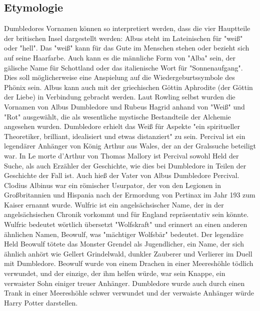 \documentclass[a4paper, 10pt]{article}
\begin{document}
\subsection*{\Large Etymologie}
Dumbledores Vornamen können so interpretiert werden, dass die vier Hauptteile der britischen Insel dargestellt werden:
\vspace{10pt}
\newline
Albus steht im Lateinischen für "weiß" oder "hell". Das "weiß" kann für das Gute im Menschen stehen oder bezieht sich auf seine Haarfarbe. Auch kann es die männliche Form von "Alba" sein, der gälische Name für Schottland oder das italienische Wort für "Sonnenaufgang". Dies soll möglicherweise eine Anspielung auf die Wiedergeburtssymbole des Phönix sein. Albus kann auch mit der griechischen Göttin Aphrodite (der Göttin der Liebe) in Verbindung gebracht werden. Laut Rowling selbst wurden die Vornamen von Albus Dumbledore und Rubeus Hagrid anhand von "Weiß" und "Rot" ausgewählt, die als wesentliche mystische Bestandteile der Alchemie angesehen wurden. Dumbledore erhielt das Weiß für Aspekte "ein spiritueller Theoretiker, brilliant, idealisiert und etwas distanziert" zu sein.
\vspace{10pt}
\newline
Percival ist ein legendärer Anhänger von König Arthur aus Wales, der an der Gralssuche beteiligt war. In Le morte d'Arthur von Thomas Mallory ist Percival sowohl Held der Suche, als auch Erzähler der Geschichte, wie dies bei Dumbledore in Teilen der Geschichte der Fall ist. Auch hieß der Vater von Albus Dumbledore Percival.
\vspace{10pt}
\newline
Clodius Albinus war ein römischer Usurpator, der von den Legionen in Großbritannien und Hispania nach der Ermordung von Pertinax im Jahr 193 zum Kaiser ernannt wurde.
\vspace{10pt}
\newline
Wulfric ist ein angelsächsischer Name, der in der angelsächsischen Chronik vorkommt und für England repräsentativ sein könnte. Wulfric bedeutet wörtlich übersetzt "Wolfskraft" und erinnert an einen anderen ähnlichen Namen, Beowulf, was "mächtiger Wolfsbär" bedeutet. Der legendäre Held Beowulf tötete das Monster Grendel als Jugendlicher, ein Name, der sich ähnlich anhört wie Gellert Grindelwald, dunkler Zauberer und Verlierer im Duell mit Dumbledore. Beowulf wurde von einem Drachen in einer Meereshöhle tödlich verwundet, und der einzige, der ihm helfen würde, war sein Knappe, ein verwaister Sohn einiger treuer Anhänger. Dumbledore wurde auch durch einen Trank in einer Meereshöhle schwer verwundet und der verwaiste Anhänger würde Harry Potter darstellen.
\end{document}
